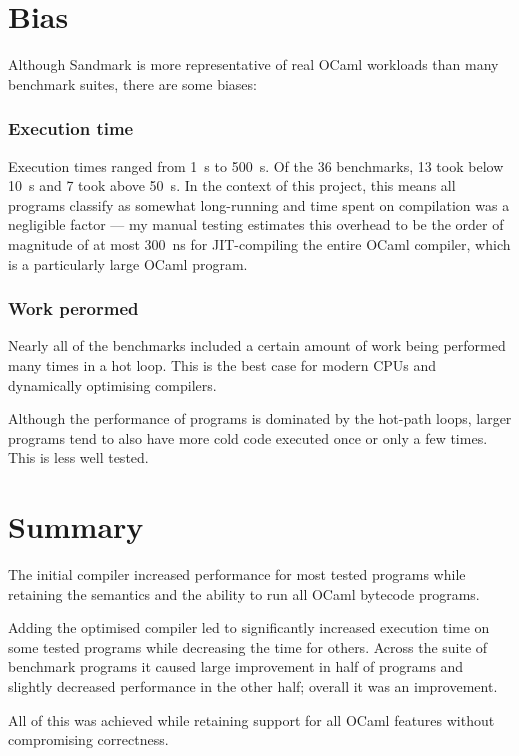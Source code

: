 \section{Bias}

Although Sandmark is more representative of real OCaml workloads than many benchmark suites, there
are some biases:

\subsubsection{Execution time} \label{bias-exec-time}

Execution times ranged from \SI{1}{\second} to \SI{500}{\second}. Of the 36 benchmarks, 13 took
below \SI{10}{\second} and 7 took above \SI{50}{\second}.  In the context of this project, this
means all programs classify as somewhat long-running and time spent on compilation was a negligible
factor --- my manual testing estimates this overhead to be the order of magnitude of at most
\SI{300}{\nano\second} for JIT-compiling the entire OCaml compiler, which is a particularly large
OCaml program.

\subsubsection{Work perormed}

Nearly all of the benchmarks included a certain amount of work being performed many times in a hot
loop. This is the best case for modern CPUs and dynamically optimising compilers.

Although the performance of programs is dominated by the hot-path loops, larger programs tend to
also have more cold code executed once or only a few times. This is less well tested.

\section{Summary}

The initial compiler increased performance for most tested programs while retaining the semantics
and the ability to run all OCaml bytecode programs.

Adding the optimised compiler led to significantly increased execution time on some tested programs
while decreasing the time for others. Across the suite of benchmark programs it caused large
improvement in half of programs and slightly decreased performance in the other half; overall it
was an improvement.

All of this was achieved while retaining support for all OCaml features without compromising
correctness.